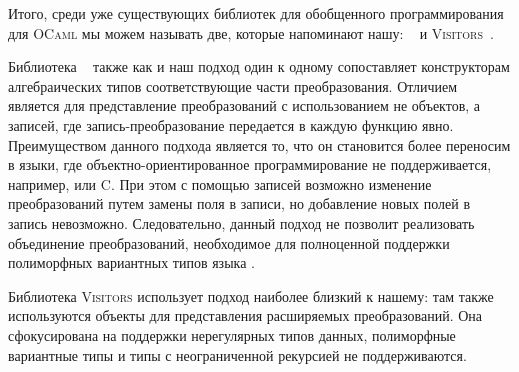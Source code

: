 Итого, среди уже существующих библиотек для обобщенного программирования для \textsc{OCaml} мы можем называть две, которые напоминают нашу: ~\cite{ppxderiving} %
и \textsc{Visitors}~\cite{Visitors}.

\begin{comment}
Подход \cd{ppx\_deriving} является наипростейшим: объявления типов данных отображаются один к одному в рекурсивные функции, представляющие конкретный вид преобразования. Это наиболее эффективная реализация, так как функции вызываются напрямую, без позднего связывания, но нерасширяемая. Если пользователю понадобится слегка модифицировать сгенерированную функцию, то он должен будет полностью скопировать реализацию функции и изменить её. Количество работы по программированию нового преобразования может существенно увеличиться, если тип данных будет видоизменяться во время цикла разработки.
\end{comment}

\begin{comment}
В \cd{ppx\_traverse} расширяемые преобразования также представлены как объекты. В отличие от нашего подхода, там не используется кодирование конструкторов и методов один к одному. К тому же \cd{ppx\_traverse} не использует наследуемые атрибуты, следовательно некоторые преобразования, такие как проверка на равенство и сравнение, невыразимы.
\end{comment}

Библиотека   ~\cite{derivingMorphism} также как и наш подход один к одному сопоставляет конструкторам алгебраических типов соответствующие части преобразования. Отличием является для представление преобразований с использованием не объектов, а записей, где запись-преобразование передается в каждую функцию явно. Преимуществом данного подхода является то, что он становится более переносим в языки, где объектно-ориентированное программирование не поддерживается, например, 
\haskell{} или \textsc{C}. При этом с помощью записей возможно изменение преобразований путем замены поля в записи, но добавление новых полей в запись невозможно. Следовательно, данный подход не позволит реализовать объединение преобразований, необходимое для полноценной поддержки полиморфных вариантных типов языка \OCaml{}.

Библиотека \textsc{Visitors} использует подход наиболее близкий к нашему: там также используются объекты для представления расширяемых преобразований. 
Она сфокусирована на поддержки нерегулярных типов данных,  полиморфные вариантные типы и типы с неограниченной рекурсией не поддерживаются. 

